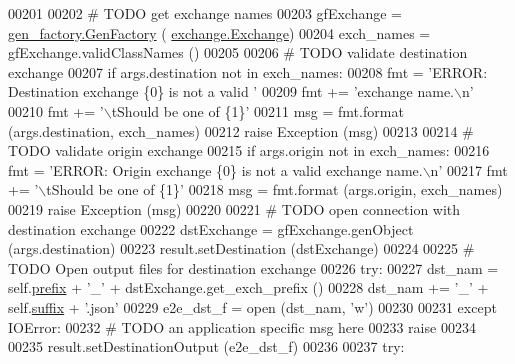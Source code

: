 \begin{DoxyCode}
00201 
00202         \textcolor{comment}{# TODO get exchange names }
00203         gfExchange = \hyperlink{classgen__factory_1_1_gen_factory}{gen\_factory.GenFactory} (
      \hyperlink{classexchange_1_1_exchange}{exchange.Exchange})
00204         exch\_names = gfExchange.validClassNames ()
00205             
00206         \textcolor{comment}{# TODO validate destination exchange}
00207         \textcolor{keywordflow}{if} args.destination \textcolor{keywordflow}{not} \textcolor{keywordflow}{in} exch\_names:
00208             fmt  = \textcolor{stringliteral}{'ERROR: Destination exchange \{0\} is not a valid '}
00209             fmt += \textcolor{stringliteral}{'exchange name.\(\backslash\)n'}
00210             fmt += \textcolor{stringliteral}{'\(\backslash\)tShould be one of \{1\}'}
00211             msg = fmt.format (args.destination, exch\_names)
00212             \textcolor{keywordflow}{raise} Exception (msg)
00213             
00214         \textcolor{comment}{# TODO validate origin exchange}
00215         \textcolor{keywordflow}{if} args.origin \textcolor{keywordflow}{not} \textcolor{keywordflow}{in} exch\_names:
00216             fmt  = \textcolor{stringliteral}{'ERROR: Origin exchange \{0\} is not a valid exchange name.\(\backslash\)n'}
00217             fmt += \textcolor{stringliteral}{'\(\backslash\)tShould be one of \{1\}'}
00218             msg = fmt.format (args.origin, exch\_names)
00219             \textcolor{keywordflow}{raise} Exception (msg)
00220         
00221         \textcolor{comment}{# TODO open connection with destination exchange}
00222         dstExchange = gfExchange.genObject (args.destination)
00223         result.setDestination (dstExchange)
00224             
00225         \textcolor{comment}{# TODO Open output files for destination exchange}
00226         \textcolor{keywordflow}{try}:
00227             dst\_nam  =  self.\hyperlink{classe2e_1_1_application_a027ff25e5409ae17584978a09fc2611a}{prefix} + \textcolor{stringliteral}{'\_'} + dstExchange.get\_exch\_prefix ()
00228             dst\_nam += \textcolor{stringliteral}{'\_'} + self.\hyperlink{classe2e_1_1_application_a4d824ad36b051d2d629edb314385df0d}{suffix} + \textcolor{stringliteral}{'.json'}
00229             e2e\_dst\_f = open (dst\_nam, \textcolor{stringliteral}{'w'})
00230             
00231         \textcolor{keywordflow}{except} IOError:
00232             \textcolor{comment}{# TODO an application specific msg here}
00233             \textcolor{keywordflow}{raise}
00234             
00235         result.setDestinationOutput (e2e\_dst\_f)
00236             
00237         \textcolor{keywordflow}{try}:

\end{DoxyCode}
